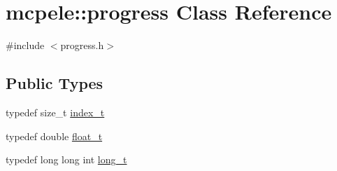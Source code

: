 \hypertarget{classmcpele_1_1progress}{\section{mcpele\-:\-:progress \-Class \-Reference}
\label{classmcpele_1_1progress}
}


{\ttfamily \#include $<$progress.\-h$>$}

\subsection*{\-Public \-Types}
\begin{DoxyCompactItemize}
\item 
typedef size\-\_\-t \hyperlink{classmcpele_1_1progress_a3af9df6e1a8f337ef00e368820377316}{index\-\_\-t}
\item 
typedef double \hyperlink{classmcpele_1_1progress_a58b0ad8ca4041095da304be26345e533}{float\-\_\-t}
\item 
typedef long long int \hyperlink{classmcpele_1_1progress_aca882b448ea2df62757b62ccdcf72064}{long\-\_\-t}
\end{DoxyCompactItemize}
